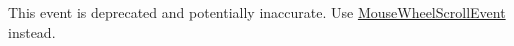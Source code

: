
\begin{DoxyRefList}
\item[\label{deprecated__deprecated000001}%
\Hypertarget{deprecated__deprecated000001}%
Classe \hyperlink{structsf_1_1Event_1_1MouseWheelEvent}{sf\+:\+:Event\+:\+:Mouse\+Wheel\+Event} ]This event is deprecated and potentially inaccurate. Use \hyperlink{structsf_1_1Event_1_1MouseWheelScrollEvent}{Mouse\+Wheel\+Scroll\+Event} instead.
\end{DoxyRefList}